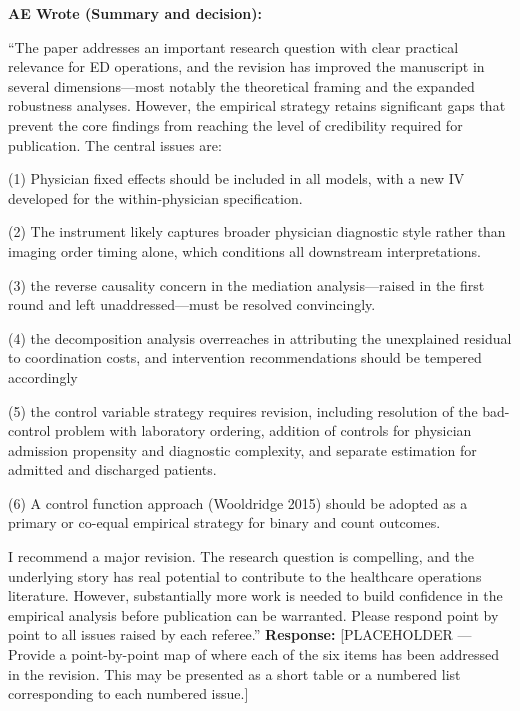 \documentclass[11pt]{article}
\newenvironment{quote2}
{ \bigskip
\noindent
         \small\em
         \baselineskip=14pt
}
\newcommand{\1}{\hbox{\rm 1\kern-.35em 1}}
\begin{document}
\begin{quote2}
\textbf{AE Wrote (Summary and decision):}

\noindent ``The paper addresses an important research question with clear practical relevance for ED operations, and the revision has improved the manuscript in several dimensions---most notably the theoretical framing and the expanded robustness analyses. However, the empirical strategy retains significant gaps that prevent the core findings from reaching the level of credibility required for publication. The central issues are:

(1) Physician fixed effects should be included in all models, with a new IV developed for the within-physician specification.

(2) The instrument likely captures broader physician diagnostic style rather than imaging order timing alone, which conditions all downstream interpretations.

(3) the reverse causality concern in the mediation analysis---raised in the first round and left unaddressed---must be resolved convincingly.

(4) the decomposition analysis overreaches in attributing the unexplained residual to coordination costs, and intervention recommendations should be tempered accordingly

(5) the control variable strategy requires revision, including resolution of the bad-control problem with laboratory ordering, addition of controls for physician admission propensity and diagnostic complexity, and separate estimation for admitted and discharged patients.

(6) A control function approach (Wooldridge 2015) should be adopted as a primary or co-equal empirical strategy for binary and count outcomes.

I recommend a major revision. The research question is compelling, and the underlying story has real potential to contribute to the healthcare operations literature. However, substantially more work is needed to build confidence in the empirical analysis before publication can be warranted. Please respond point by point to all issues raised by each referee.''
\end{quote2}

\noindent\textbf{Response:} \color{blue}[PLACEHOLDER --- Provide a point-by-point map of where each of the six items has been addressed in the revision. This may be presented as a short table or a numbered list corresponding to each numbered issue.]
\color{black}
\end{document}
